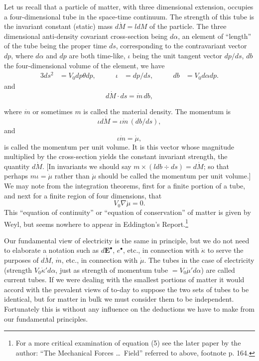 \documentclass[11pt]{article}
\begin{document}
\indent Let us recall that a particle of matter, with three dimensional extension, occupies a four-dimensional tube in the space-time continuum. The strength of this tube is the invariant constant (static) mass $d\dot M=ldM$ of the particle. The three dimensional anti-density covariant cross-section being $d\alpha$, an element of ``length'' of the tube being the proper time $ds$, corresponding to the contravariant vector $dp$, where $d\alpha$ and $dp$ are both time-like, $\iota$ being the unit tangent vector $dp/ds$, $db$ the four-dimensional volume of the element, we have
\begin{alignat}{3}
  ds^2&=V_0dp\theta dp, &\qquad \iota&=dp/ds, &\qquad db&=V_0d\alpha dp. \tag{1}
\end{alignat}
and
\begin{equation}
  d\dot M\mathbin{\cdot}ds=\dot m\,db,
  \tag{2}
\end{equation}

where $\dot m$ or sometimes $m$ is called the material density. The momentum is
\begin{equation}
  \iota d\dot M=\iota\dot m\,(db/ds),
  \tag{3}
\end{equation}
and
\begin{equation}
  \iota\dot m=\dot\mu,
  \tag{4}
\end{equation}
is called the momentum per unit volume. It is this vector whose magnitude multiplied by the cross-section yields the constant invariant strength, the quantity $d\dot M$. [In invariants we should say $m\times(ldb\div ds)=d\dot M$; so that perhaps $m\iota=\dot\mu$ rather than $\dot\mu$ should be called the momentum per unit volume.] We may note from the integration theorems, first for a finite portion of a tube, and next for a finite region of four dimensions, that
\begin{equation}
  V_0\nabla\dot\mu=0.
  \tag{5}
\end{equation}
This ``equation of continuity'' or ``equation of conservation'' of matter is given by Weyl, but seems nowhere to appear in Eddington's Report.\footnote{For a more critical examination of equation (5) see the later paper by the author: ``The Mechanical Forces \ldots\ Field'' referred to above, footnote p. 164.}

\indent Our fundamental view of electricity is the same in principle, but we do not need to elaborate a notation such as $d\mathbf{E}^\bullet$, $e^\bullet$, etc., in connection with $\dot\kappa$ to serve the purposes of $d\dot M$, $\dot m$, etc., in connection with $\dot\mu$. The tubes in the case of electricity (strength $V_0\dot\kappa' d\alpha$, just as strength of momentum tube $=V_0\dot\mu' d\alpha$) are called current tubes. If we were dealing with the smallest portions of matter it would accord with the prevalent views of to-day to suppose the two sets of tubes to be identical, but for matter in bulk we must consider them to be independent. Fortunately this is without any influence on the deductions we have to make from our fundamental principles.
\end{document}
